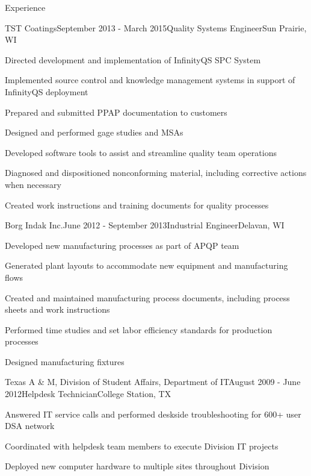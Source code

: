 \documentclass{resume} %
\begin{document}
\begin{rSection}{Experience}

\begin{rSubsection}{TST Coatings}{September 2013 - March 2015}{Quality Systems Engineer}{Sun Prairie, WI}
\item Directed development and implementation of InfinityQS SPC System
\item Implemented source control and knowledge management systems in support of InfinityQS deployment
\item Prepared and submitted PPAP documentation to customers
\item Designed and performed gage studies and MSAs
\item Developed software tools to assist and streamline quality team operations
\item Diagnosed and dispositioned nonconforming material, including corrective actions when necessary
\item Created work instructions and training documents for quality processes
\end{rSubsection}


\begin{rSubsection}{Borg Indak Inc.}{June 2012 - September 2013}{Industrial Engineer}{Delavan, WI}
\item Developed new manufacturing processes as part of APQP team
\item Generated plant layouts to accommodate new equipment and manufacturing flows
\item Created and maintained manufacturing process documents, including process sheets and work instructions
\item Performed time studies and set labor efficiency standards for production processes
\item Designed manufacturing fixtures
\end{rSubsection}


\begin{rSubsection}{Texas A \& M, Division of Student Affairs, Department of IT}{August 2009 - June 2012}{Helpdesk Technician}{College Station, TX}
\item Answered IT service calls and performed deskside troubleshooting for 600+ user DSA network
\item Coordinated with helpdesk team members to execute Division IT projects
\item Deployed new computer hardware to multiple sites throughout Division
\end{rSubsection}

\end{rSection}
\end{document}

